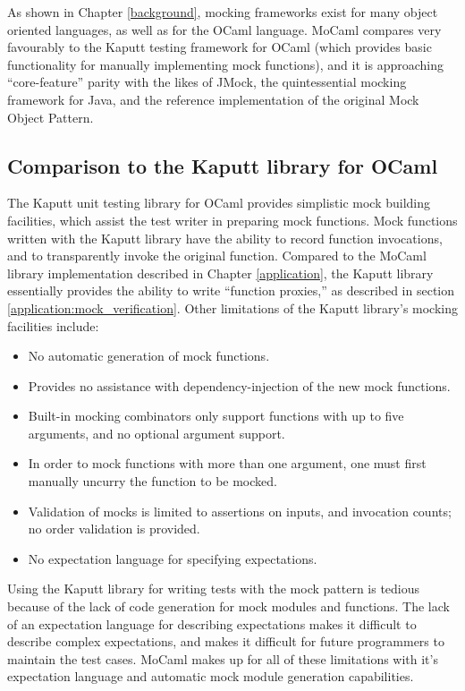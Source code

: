As shown in Chapter \ref{background}, mocking frameworks exist for
many object oriented languages, as well as for the OCaml
language. MoCaml compares very favourably to the Kaputt testing
framework for OCaml (which provides basic functionality for manually
implementing mock functions), and it is approaching ``core-feature''
parity with the likes of JMock, the quintessential mocking framework
for Java, and the reference implementation of the original Mock Object
Pattern.

\subsection{Comparison to the Kaputt library for OCaml}

The Kaputt unit testing library for OCaml provides simplistic mock
building facilities, which assist the test writer in preparing mock
functions. Mock functions written with the Kaputt library have the
ability to record function invocations, and to transparently invoke
the original function. Compared to the MoCaml library implementation
described in Chapter \ref{application}, the Kaputt library essentially
provides the ability to write ``function proxies,'' as described in
section \ref{application:mock_verification}. Other limitations of the
Kaputt library's mocking facilities include:

\begin{itemize}
\item No automatic generation of mock functions.
\item Provides no assistance with dependency-injection of the new mock
  functions.
\item Built-in mocking combinators only support functions with up to
  five arguments, and no optional argument support.
\item In order to mock functions with more than one argument, one must
  first manually uncurry the function to be mocked.
\item Validation of mocks is limited to assertions on inputs, and
  invocation counts; no order validation is provided.
\item No expectation language for specifying expectations.
\end{itemize}

Using the Kaputt library for writing tests with the mock pattern is
tedious because of the lack of code generation for mock modules and
functions. The lack of an expectation language for describing
expectations makes it difficult to describe complex expectations, and
makes it difficult for future programmers to maintain the test
cases. MoCaml makes up for all of these limitations with it's
expectation language and automatic mock module generation
capabilities.

